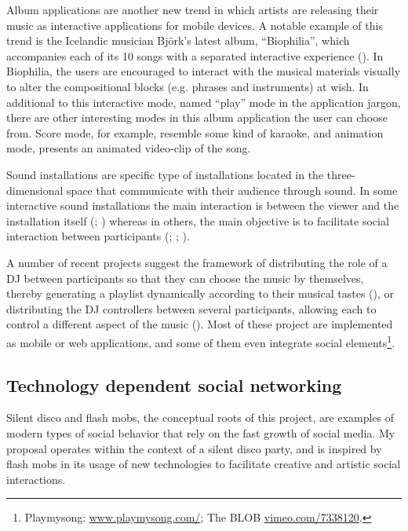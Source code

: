 \documentclass[a4paper,11pt]{article}
\begin{document}
Album applications are another new trend in which artists are releasing their music as interactive applications for mobile devices.
A notable example of this trend is the Icelandic musician Bj\"{o}rk's latest album, ``Biophilia'', which accompanies each of its 10 songs with a separated interactive experience (\cite{stimulant13}).
In Biophilia, the users are encouraged to interact with the musical materials visually to alter the compositional blocks (e.g. phrases and instruments) at wish.
In additional to this interactive mode, named ``play'' mode in the application jargon, there are other interesting modes in this album application the user can choose from.
Score mode, for example, resemble some kind of karaoke, and animation mode, presents an animated video-clip of the song.

Sound installations are specific type of installations located in the three-dimensional space that communicate with their audience through sound.
In some interactive sound installations the main interaction is between the viewer and the installation itself (\cite{web:visnjic}; \cite{web:cardiff01}) whereas in others, the main objective is to facilitate social interaction between participants (\cite{eng03}; \cite{web:kirn12}; \cite{web:murray-browne13}).

A number of recent projects suggest the framework of distributing the role of a DJ between participants so that they can choose the music by themselves, thereby generating a playlist dynamically according to their musical tastes (\cite{web:shaw}), or distributing the DJ controllers between several participants, allowing each to control a different aspect of the music (\cite{web:shapira}).
Most of these project are implemented as mobile or web applications, and some of them even integrate social elements\footnote{Playmysong: \href{http://www.playmysong.com/}{www.playmysong.com/}; The BLOB \href{http://vimeo.com/7338120}{vimeo.com/7338120}.}.

\subsection{Technology dependent social networking} \label{literature:social_tech}

Silent disco and flash mobs, the conceptual roots of this project, are examples of modern types of social behavior that rely on the fast growth of social media.
My proposal operates within the context of a silent disco party, and is inspired by flash mobs in its usage of new technologies to facilitate creative and artistic social interactions.
\end{document}
